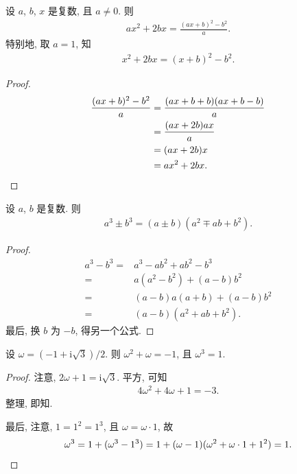 \documentclass[../libro.tex]{subfiles}
\begin{document}
\begin{theorem}
    设 \(a\), \(b\), \(x\) 是复数,
    且 \(a \neq 0\).
    则
    \begin{align*}
        ax^2 + 2bx
        = \frac{(ax + b)^2 - b^2}{a}.
    \end{align*}
    特别地, 取 \(a = 1\),
    知
    \begin{align*}
        x^2 + 2bx = (x + b)^2 - b^2.
    \end{align*}
\end{theorem}

\begin{proof}
    \begin{align*}
        \frac{(ax + b)^2 - b^2}{a}
        = {} & \frac{(ax + b + b)(ax + b - b)}{a} \\
        = {} & \frac{(ax + 2b)ax}{a}              \\
        = {} & (ax + 2b)x                         \\
        = {} & ax^2 + 2bx.
        \qedhere
    \end{align*}
\end{proof}

\begin{theorem}
    设 \(a\), \(b\) 是复数.
    则
    \begin{align*}
        a^3 \pm b^3 = (a \pm b)(a^2 \mp ab + b^2).
    \end{align*}
\end{theorem}

\begin{proof}
    \begin{align*}
        a^3 - b^3
        = {} & a^3 - ab^2 + ab^2 - b^3 \\
        = {} & a(a^2 - b^2) + (a-b)b^2 \\
        = {} & (a-b)a(a+b) + (a-b)b^2  \\
        = {} & (a-b)(a^2 + ab + b^2).
    \end{align*}
    最后, 换 \(b\) 为 \(-b\),
    得另一个公式.
\end{proof}

\begin{theorem}
    设 \(\omega = (-1 + \mathrm{i} \sqrt{3})/2\).
    则 \(\omega^2 + \omega = -1\),
    且 \(\omega^3 = 1\).
\end{theorem}

\begin{proof}
    注意, \(2\omega + 1 = \mathrm{i} \sqrt{3}\).
    平方, 可知
    \begin{align*}
        4\omega^2 + 4\omega + 1 = -3.
    \end{align*}
    整理, 即知.

    最后, 注意, \(1 = 1^2 = 1^3\),
    且 \(\omega = \omega \cdot 1\),
    故
    \begin{equation*}
        \omega^3
        = 1 + (\omega^3 - 1^3)
        = 1 + (\omega - 1)(\omega^2 + \omega \cdot 1 + 1^2)
        = 1.
        \qedhere
    \end{equation*}
\end{proof}
\end{document}
